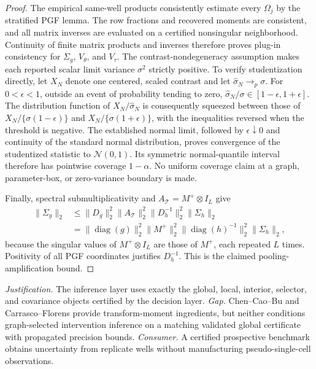 \documentclass{article}
\begin{document}
\begin{proof}
The empirical same-well products consistently estimate every \(\Omega_j\) by the stratified PGF lemma.  The row fractions and recovered moments are consistent, and all matrix inverses are evaluated on a certified nonsingular neighborhood.  Continuity of finite matrix products and inverses therefore proves plug-in consistency for \(\Sigma_g\), \(V_\theta\), and \(V_\tau\).  The contrast-nondegeneracy assumption makes each reported scalar limit variance \(\sigma^2\) strictly positive.  To verify studentization directly, let \(X_N\) denote one centered, scaled contrast and let \(\widehat\sigma_N\to_p\sigma\).  For \(0<\epsilon<1\), outside an event of probability tending to zero, \(\widehat\sigma_N/\sigma\in[1-\epsilon,1+\epsilon]\).  The distribution function of \(X_N/\widehat\sigma_N\) is consequently squeezed between those of \(X_N/\{\sigma(1-\epsilon)\}\) and \(X_N/\{\sigma(1+\epsilon)\}\), with the inequalities reversed when the threshold is negative.  The established normal limit, followed by \(\epsilon\downarrow0\) and continuity of the standard normal distribution, proves convergence of the studentized statistic to \(\mathcal N(0,1)\).  Its symmetric normal-quantile interval therefore has pointwise coverage \(1-\alpha\).  No uniform coverage claim at a graph, parameter-box, or zero-variance boundary is made.

Finally, spectral submultiplicativity and \(A_{\mathcal T}=M^+\otimes I_L\) give
\[
\begin{aligned}
 \|\Sigma_g\|_2
 &\leq\|D_g\|_2^2\|A_{\mathcal T}\|_2^2
 \|D_h^{-1}\|_2^2\|\Sigma_h\|_2\\
 &=\|\operatorname{diag}(g)\|_2^2\|M^+\|_2^2
 \|\operatorname{diag}(h)^{-1}\|_2^2\|\Sigma_h\|_2,
\end{aligned}
\]
because the singular values of \(M^+\otimes I_L\) are those of \(M^+\), each repeated \(L\) times.  Positivity of all PGF coordinates justifies \(D_h^{-1}\).  This is the claimed pooling-amplification bound.
\end{proof}
\par\smallskip\noindent \textit{Justification.} The inference layer uses exactly the global, local, interior, selector, and covariance objects certified by the decision layer. \textit{Gap.} Chen--Cao--Bu and Carrasco--Florens provide transform-moment ingredients, but neither conditions graph-selected intervention inference on a matching validated global certificate with propagated precision bounds. \textit{Consumer.} A certified prospective benchmark obtains uncertainty from replicate wells without manufacturing pseudo-single-cell observations.
\end{document}

